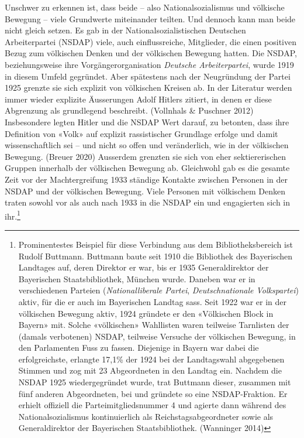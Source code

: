\documentclass[a4paper,
fontsize=11pt,
oneside,
numbers=noperiodatend,
parskip=half-,
bibliography=totoc,
final
]{scrartcl}
\begin{document}
Unschwer zu erkennen ist, dass beide -- also Nationalsozialismus und
völkische Bewegung -- viele Grundwerte miteinander teilten. Und dennoch
kann man beide nicht gleich setzen. Es gab in der
Nationalsozialistischen Deutschen Arbeiterpartei (NSDAP) viele, auch
einflussreiche, Mitglieder, die einen positiven Bezug zum völkischen
Denken und der völkischen Bewegung hatten. Die NSDAP, beziehungsweise
ihre Vorgängerorganisation \emph{Deutsche Arbeiterpartei}, wurde 1919 in
diesem Umfeld gegründet. Aber spätestens nach der Neugründung der Partei
1925 grenzte sie sich explizit von völkischen Kreisen ab. In der
Literatur werden immer wieder explizite Äusserungen Adolf Hitlers
zitiert, in denen er diese Abgrenzung als grundlegend beschreibt.
(Vollnhals \& Puschner 2012) Insbesondere legten Hitler und die NSDAP
Wert darauf, zu betonten, dass ihre Definition von «Volk» auf explizit
rassistischer Grundlage erfolge und damit wissenschaftlich sei -- und
nicht so offen und veränderlich, wie in der völkischen Bewegung. (Breuer
2020) Ausserdem grenzten sie sich von eher sektiererischen Gruppen
innerhalb der völkischen Bewegung ab. Gleichwohl gab es die gesamte Zeit
vor der Machtergreifung 1933 ständige Kontakte zwischen Personen in der
NSDAP und der völkischen Bewegung. Viele Personen mit völkischem Denken
traten sowohl vor als auch nach 1933 in die NSDAP ein und engagierten
sich in ihr.\footnote{Prominentestes Beispiel für diese Verbindung aus
  dem Bibliotheksbereich ist Rudolf Buttmann. Buttmann baute seit 1910
  die Bibliothek des Bayerischen Landtages auf, deren Direktor er war,
  bis er 1935 Generaldirektor der Bayerischen Staatsbibliothek, München
  wurde. Daneben war er in verschiedenen Parteien
  (\emph{Nationalliberale Partei}, \emph{Deutschnationale Volkspartei})
  aktiv, für die er auch im Bayerischen Landtag sass. Seit 1922 war er
  in der völkischen Bewegung aktiv, 1924 gründete er den «Völkischen
  Block in Bayern» mit. Solche «völkischen» Wahllisten waren teilweise
  Tarnlisten der (damals verbotenen) NSDAP, teilweise Versuche der
  völkischen Bewegung, in den Parlamenten Fuss zu fassen. Diejenige in
  Bayern war dabei die erfolgreichste, erlangte 17,1\% der 1924 bei der
  Landtagswahl abgegebenen Stimmen und zog mit 23 Abgeordneten in den
  Landtag ein. Nachdem die NSDAP 1925 wiedergegründet wurde, trat
  Buttmann dieser, zusammen mit fünf anderen Abgeordneten, bei und
  gründete so eine NSDAP-Fraktion. Er erhielt offiziell die
  Parteimitgliedsnummer 4 und agierte dann während des
  Nationalsozialismus kontinuierlich als Reichstagsabgeordneter sowie
  als Generaldirektor der Bayerischen Staatsbibliothek. (Wanninger 2014)}
\end{document}
